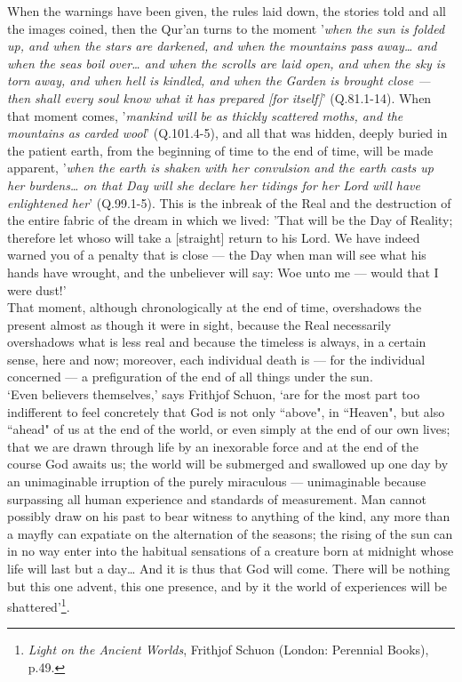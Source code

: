 \documentclass[10pt, twoside]{book}
\begin{document}
When the warnings have been given, the rules laid down, the stories told and all the images coined, 
then the Qur'an turns to the moment '\emph{when the sun is folded up, and when the stars are darkened, and when the mountains pass away\ldots{} and when the seas boil over\ldots{} and when the scrolls are laid open, and when the sky is torn away, and when hell is kindled, and when the Garden is brought close --- then shall every soul know what it has prepared [for itself]}' (Q.81.1-14). When that moment comes, '\emph{mankind will be as thickly scattered moths, and the mountains as carded wool}' (Q.101.4-5), and all that was hidden, deeply buried in the patient earth, from the beginning of time to the end of time, will be made apparent, '\emph{when the earth is shaken with her convulsion and the earth casts up her burdens\ldots{} on that Day will she declare her tidings for her Lord will have enlightened her}' (Q.99.1-5). This is the inbreak of the Real and the destruction of the entire fabric of the dream in which we lived: 'That will be the Day of Reality; therefore let whoso will take a [straight] return to his Lord. We 
have indeed warned you of a penalty that is close --- the Day when man will see what his hands have 
wrought, and the unbeliever will say: Woe unto me --- would that I were dust!' \\

That moment, although chronologically at the end of time, overshadows the present almost as though it 
were in sight, because the Real necessarily overshadows what is less real and because the timeless is 
always, in a certain sense, here and now; moreover, each individual death is --- for the individual 
concerned --- a prefiguration of the end of all things under the sun. \\

`Even believers themselves,' says Frithjof Schuon, `are for the most part too indifferent to feel 
concretely that God is not only ``above", in ``Heaven", but also ``ahead" of us at the end of the world, 
or even simply at the end of our own lives; that we are drawn through life by an inexorable force and 
at the end of the course God awaits us; the world will be submerged and swallowed up one day by an 
unimaginable irruption of the purely miraculous --- unimaginable because surpassing all human 
experience and standards of measurement. Man cannot possibly draw on his past to bear witness to 
anything of the kind, any more than a mayfly can expatiate on the alternation of the seasons; the 
rising of the sun can in no way enter into the habitual sensations of a creature born at midnight 
whose life will last but a day\ldots{} And it is thus that God will come. There will be nothing but this 
one advent, this one presence, and by it the world of experiences will be shattered'\footnote{\emph{Light on the Ancient Worlds}, Frithjof Schuon (London: Perennial Books), p.49.}. \\
\end{document}
